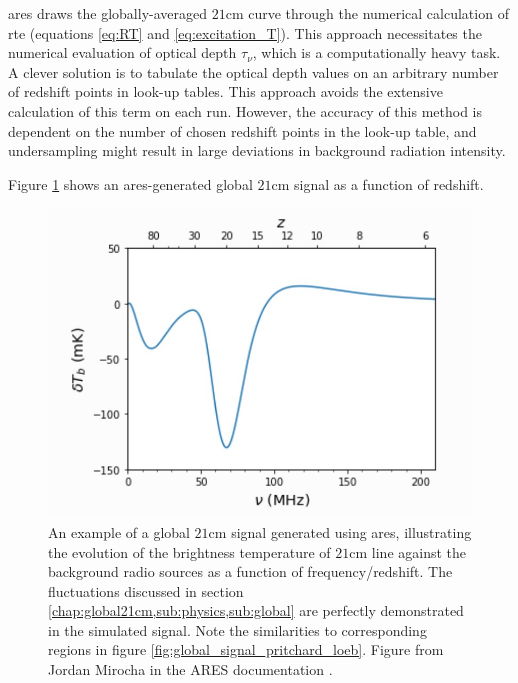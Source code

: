 \documentclass[12pt, TexShade, letterpaper]{report}
\begin{document}
\gls{ares} draws the globally-averaged $\mathrm{21cm}$ curve through the numerical calculation of \gls{rte} (equations \ref{eq:RT} and \ref{eq:excitation_T}). This approach necessitates the numerical evaluation of optical depth $\tau_\nu$, which is a computationally heavy task. A clever solution is to tabulate the optical depth values on an arbitrary number of redshift points in look-up tables. This approach avoids the extensive calculation of this term on each run. However, the accuracy of this method is dependent on the number of chosen redshift points in the look-up table, and undersampling might result in large deviations in background radiation intensity.\par
Figure \ref{fig:ares_Curve} shows an \gls{ares}-generated global $\mathrm{21cm}$ signal as a function of redshift.\par
\begin{figure}[h!]
    \centering
    \includegraphics[scale =0.8]{ares_curve.jpg}
    \caption[Typical global $\mathrm{21cm}$ curve generated using \gls{ares}]{An example of a global $\mathrm{21cm}$ signal generated using \gls{ares}, illustrating the evolution of the brightness temperature of $\mathrm{21cm}$ line against the background radio sources as a function of frequency/redshift. The fluctuations discussed in section \ref{chap:global21cm,sub:physics,sub:global} are perfectly demonstrated in the simulated signal. Note the similarities to corresponding regions in figure \ref{fig:global_signal_pritchard_loeb}. Figure from Jordan Mirocha in the ARES documentation \cite{ares_documentation}.}
    \label{fig:ares_Curve}
\end{figure}
\end{document}
